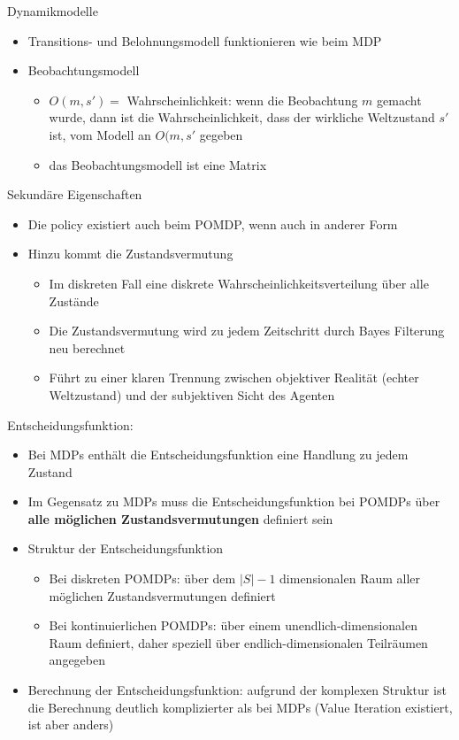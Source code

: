 Dynamikmodelle
\begin{itemize}
	\item Transitions- und Belohnungsmodell funktionieren wie beim MDP
	\item Beobachtungsmodell
	\begin{itemize}
		\item $O(m,s') =$ Wahrscheinlichkeit: wenn die Beobachtung $m$ gemacht wurde, dann ist die Wahrscheinlichkeit, dass der wirkliche Weltzustand $s'$ ist, vom Modell an $O(m,s'$ gegeben
		\item das Beobachtungsmodell ist eine Matrix
	\end{itemize}
\end{itemize}

Sekund\"are Eigenschaften
\begin{itemize}
	\item Die policy existiert auch beim POMDP, wenn auch in anderer Form
	\item Hinzu kommt die Zustandsvermutung
	\begin{itemize}
		\item Im diskreten Fall eine diskrete Wahrscheinlichkeitsverteilung \"uber alle Zust\"ande
		\item Die Zustandsvermutung wird zu jedem Zeitschritt durch Bayes Filterung neu berechnet
		\item F\"uhrt zu einer klaren Trennung zwischen objektiver Realit\"at (echter Weltzustand) und der subjektiven Sicht des Agenten
	\end{itemize}
\end{itemize}

Entscheidungsfunktion:
\begin{itemize}
	\item Bei MDPs enth\"alt die Entscheidungsfunktion eine Handlung zu jedem Zustand
	\item Im Gegensatz zu MDPs muss die Entscheidungsfunktion bei POMDPs \"uber \textbf{alle m\"oglichen Zustandsvermutungen} definiert sein
	\item Struktur der Entscheidungsfunktion
	\begin{itemize}
		\item Bei diskreten POMDPs: \"uber dem $|S|-1$ dimensionalen Raum aller m\"oglichen Zustandsvermutungen definiert
		\item Bei kontinuierlichen POMDPs: \"uber einem unendlich-dimensionalen Raum definiert, daher speziell \"uber endlich-dimensionalen Teilr\"aumen angegeben
	\end{itemize}
	\item Berechnung der Entscheidungsfunktion: aufgrund der komplexen Struktur ist die Berechnung deutlich komplizierter als bei MDPs (Value Iteration existiert, ist aber anders)
\end{itemize}

